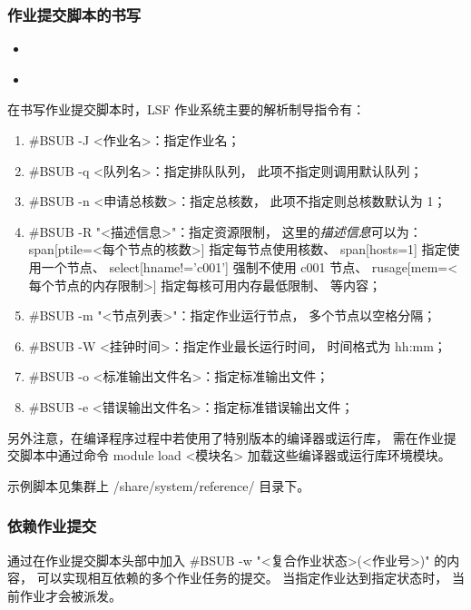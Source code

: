 \documentclass[UTF8]{ctexart}
\newcommand{\mynnote}[1]{\colorbox{gray!15}{\color{blue!65}#1}}
\newcommand{\insertbash}[2]{\begin{itemize}\item[]\end{itemize}}
\begin{document}
\subsubsection{作业提交脚本的书写}
\insertbash{material/mpi.lsf}{MPI 并行作业提交脚本示例}
\insertbash{material/openmp.lsf}{OpenMP 并行作业提交脚本示例}

在书写作业提交脚本时，LSF 作业系统主要的解析制导指令有：
\begin{enumerate}[\hspace{15mm}（1）]
  \item \mynnote{\#BSUB -J <作业名>}：指定作业名；
  \item \mynnote{\#BSUB -q <队列名>}：指定排队队列，
    此项不指定则调用默认队列；
  \item \mynnote{\#BSUB -n <申请总核数>}：指定总核数，
    此项不指定则总核数默认为 1；
  \item \mynnote{\#BSUB -R "<描述信息>"}：指定资源限制，
    这里的{\em 描述信息}可以为：\newline
    \mynnote{span[ptile=<每个节点的核数>]} 指定每节点使用核数、\newline
    \mynnote{span[hosts=1]} 指定使用一个节点、\newline
    \mynnote{select[hname!='c001']} 强制不使用 c001 节点、\newline
    \mynnote{rusage[mem=<每个节点的内存限制>]} 指定每核可用内存最低限制、\newline
    等内容；
  \item \mynnote{\#BSUB -m "<节点列表>"}：指定作业运行节点，
    多个节点以空格分隔；
  \item \mynnote{\#BSUB -W <挂钟时间>}：指定作业最长运行时间，
    时间格式为 hh:mm；
  \item \mynnote{\#BSUB -o <标准输出文件名>}：指定标准输出文件；
  \item \mynnote{\#BSUB -e <错误输出文件名>}：指定标准错误输出文件；
\end{enumerate}

另外注意，在编译程序过程中若使用了特别版本的编译器或运行库，
需在作业提交脚本中通过命令 \mynnote{module load <模块名>}
加载这些编译器或运行库环境模块。

示例脚本见集群上 /share/system/reference/ 目录下。

\subsubsection{依赖作业提交}
通过在作业提交脚本头部中加入 \mynnote{\#BSUB -w "<复合作业状态>(<作业号>)"} 的内容，
可以实现相互依赖的多个作业任务的提交。
当指定作业达到指定状态时，
当前作业才会被派发。
\end{document}
